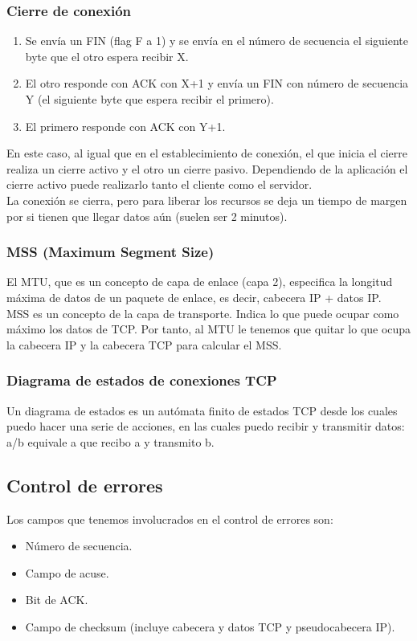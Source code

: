 \subsubsection{Cierre de conexión}
\begin{enumerate}
    \item Se envía un FIN (flag F a 1) y se envía en el número de secuencia el siguiente byte que el otro espera recibir X.
    \item El otro responde con ACK con X+1 y envía un FIN con número de secuencia Y (el siguiente byte que espera recibir el primero).
    \item El primero responde con ACK con Y+1. 
\end{enumerate}

En este caso, al igual que en el establecimiento de conexión, el que inicia el cierre realiza un cierre activo y el otro un cierre pasivo. Dependiendo de la aplicación el cierre activo puede realizarlo tanto el cliente como el servidor.\\

La conexión se cierra, pero para liberar los recursos se deja un tiempo de margen por si tienen que llegar datos aún (suelen ser 2 minutos).

\subsubsection{MSS (Maximum Segment Size)}
El MTU, que es un concepto de capa de enlace (capa 2), especifica la longitud máxima de datos de un paquete de enlace, es decir, cabecera IP + datos IP. \\

MSS es un concepto de la capa de transporte. Indica lo que puede ocupar como máximo los datos de TCP. Por tanto, al MTU le tenemos que quitar lo que ocupa la cabecera IP y la cabecera TCP para calcular el MSS. 

\subsubsection{Diagrama de estados de conexiones TCP}
Un diagrama de estados es un autómata finito de estados TCP desde los cuales puedo hacer una serie de acciones, en las cuales puedo recibir y transmitir datos: a/b equivale a que recibo a y transmito b.

\subsection{Control de errores}
Los campos que tenemos involucrados en el control de errores son:
\begin{itemize}
    \item Número de secuencia.
    \item Campo de acuse.
    \item Bit de ACK.
    \item Campo de checksum (incluye cabecera y datos TCP y pseudocabecera IP). 
\end{itemize}

